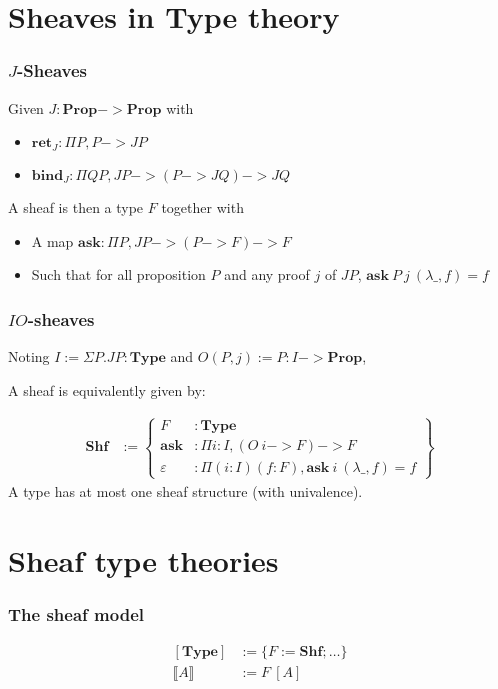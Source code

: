 \documentclass{beamer}
\newcommand{\0}{\boldsymbol{0}}
\newcommand{\1}{\boldsymbol{1}}
\begin{document}
\section{Sheaves in Type theory}

\begin{frame}
    \frametitle{$J$-Sheaves}
    Given $J : \mathbf{Prop}->\mathbf{Prop}$ with
    \begin{itemize}
        \item $\mathbf{ret}_J : \Pi P, P -> JP$
        \item $\mathbf{bind}_J : \Pi Q P, J P -> (P -> JQ)-> JQ$
    \end{itemize}
    \vspace{0.5cm}

    A sheaf is then a type $F$ together with
    \begin{itemize}
        \item A map $\mathbf{ask} : \Pi P, JP -> (P -> F) -> F$
        \item Such that for all proposition $P$ and any proof $j$ of $JP$, $\mathbf{ask}\ P\ j\ (\lambda \_, f) = f$
    \end{itemize}
\end{frame}
\begin{frame}
    \frametitle{$IO$-sheaves}
    Noting $I := \Sigma P. J P : \mathbf{Type}$ and $O (P,j) := P : I -> \mathbf{Prop}$,\vspace{0.5cm}

    A sheaf is equivalently given by:

    $$ \begin{array}{rl}
        \mathbf{Shf} &:=\left\{\begin{array}{rl}
            F& : \mathbf{Type}\\
            \mathbf{ask}&: \Pi i:I, (O\ i -> F) -> F\\
            \varepsilon&:\Pi (i:I)(f:F), \mathbf{ask}\ i\ (\lambda\_, f) = f 
        \end{array}\right\}
    \end{array}$$
    A type has at most one sheaf structure (with univalence).
\end{frame}

\section{Sheaf type theories}

\begin{frame}
   \frametitle{The sheaf model}

   $$ \begin{array}{rl}
        [\mathbf{Type}] &:= \{F:=\mathbf{Shf}; \dots\}\\
        \llbracket A \rrbracket&:= F\ [A]\\
    \end{array} $$
\end{frame}
\end{document}
